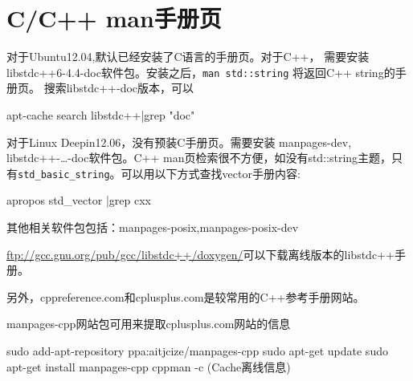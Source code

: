 \section{C/C++ man手册页}
对于Ubuntu12.04,默认已经安装了C语言的手册页。对于C++，
需要安装libstdc++6-4.4-doc软件包。安装之后，\verb+man std::string+
将返回C++ string的手册页。
搜索libstdc++-doc版本，可以
\begin{shellcmd}
	apt-cache search libstdc++|grep "doc"
\end{shellcmd}


对于Linux Deepin12.06，没有预装C手册页。需要安装
manpages-dev, libstdc++-\ldots-doc软件包。C++ man页检索很不方便，如没有std::string主题，只有\verb+std_basic_string+。可以用以下方式查找vector手册内容:
\begin{shellcmd}
	apropos std_vector |grep cxx
\end{shellcmd}

其他相关软件包包括：manpages-posix,manpages-posix-dev

\url{ftp://gcc.gnu.org/pub/gcc/libstdc++/doxygen/}可以下载离线版本的libstdc++手册。

另外，cppreference.com和cplusplus.com是较常用的C++参考手册网站。

manpages-cpp网站包可用来提取cplusplus.com网站的信息
\begin{shellcmd}
	sudo add-apt-repository ppa:aitjcize/manpages-cpp
	sudo apt-get update
	sudo apt-get install manpages-cpp
	cppman -c (Cache离线信息)
\end{shellcmd}


